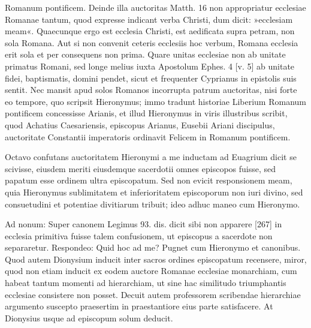 Romanum pontificem. Deinde illa auctoritas Matth. 16 non appropriatur ecclesiae Romanae tantum, quod expresse indicant verba Christi, dum dicit: »ecclesiam meam«. Quaecunque ergo est ecclesia Christi, est aedificata supra petram, non sola Romana. Aut si non convenit ceteris ecclesiis hoc verbum, Romana ecclesia erit sola et per consequens non prima. Quare unitas ecclesiae non ab unitate primatus Romani, sed longe melius iuxta Apostolum Ephes. 4 [v. 5] ab unitate fidei, baptismatis, domini pendet, sicut et frequenter Cyprianus in epistolis suis sentit. Nec mansit apud solos Romanos incorrupta patrum auctoritas, nisi forte eo tempore, quo scripsit Hieronymus; immo tradunt historiae Liberium Romanum pontificem concessisse Arianis, et illud Hieronymus in viris illustribus scribit, quod Achatius Caesariensis, episcopus Arianus, Eusebii Ariani discipulus, auctoritate Constantii imperatoris ordinavit Felicem in Romanum pontificem.

Octavo confutans auctoritatem Hieronymi a me inductam ad Euagrium dicit se scivisse, eiusdem meriti eiusdemque sacerdotii omnes episcopos fuisse, sed papatum esse ordinem ultra episcopatum. Sed non evicit responsionem meam, quia Hieronymus sublimitatem et inferioritatem episcoporum non iuri divino, sed consuetudini et potentiae divitiarum tribuit; ideo adhuc maneo cum Hieronymo.

Ad nonum: Super canonem Legimus 93. dis. dicit sibi non apparere [267] in ecclesia primitiva fuisse talem confusionem, ut episcopus a sacerdote non separaretur. Respondeo: Quid hoc ad me? Pugnet cum Hieronymo et canonibus. Quod autem Dionysium inducit inter sacros ordines episcopatum recensere, miror, quod non etiam inducit ex eodem auctore Romanae ecclesiae monarchiam, cum habeat tantum momenti ad hierarchiam, ut sine hac similitudo triumphantis ecclesiae consistere non posset. Decuit autem professorem scribendae hierarchiae argumento suscepto praesertim in praestantiore eius parte satisfacere. At Dionysius usque ad episcopum solum deducit.

